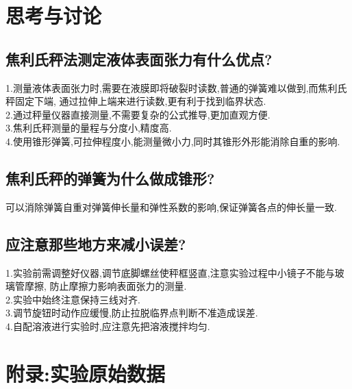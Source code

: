 \documentclass[12pt,a4paper,oneside]{ctexart}
\begin{document}
\section{思考与讨论}
\subsection{焦利氏秤法测定液体表面张力有什么优点?}
\noindent
1.测量液体表面张力时,需要在液膜即将破裂时读数,普通的弹簧难以做到,而焦利氏秤固定下端,
通过拉伸上端来进行读数,更有利于找到临界状态.\\
2.通过秤量仪器直接测量,不需要复杂的公式推导,更加直观方便.\\
3.焦利氏秤测量的量程与分度小,精度高.\\
4.使用锥形弹簧,可拉伸程度小,能测量微小力,同时其锥形外形能消除自重的影响.
\subsection{焦利氏秤的弹簧为什么做成锥形?}
\noindent
可以消除弹簧自重对弹簧伸长量和弹性系数的影响,保证弹簧各点的伸长量一致.
\subsection{应注意那些地方来减小误差?}
\noindent
1.实验前需调整好仪器,调节底脚螺丝使秤框竖直,注意实验过程中小镜子不能与玻璃管摩擦,
防止摩擦力影响表面张力的测量.\\
2.实验中始终注意保持三线对齐.\\
3.调节旋钮时动作应缓慢,防止拉脱临界点判断不准造成误差.\\
4.自配溶液进行实验时,应注意先把溶液搅拌均匀.
\newpage
\section{附录:实验原始数据}
\end{document}
